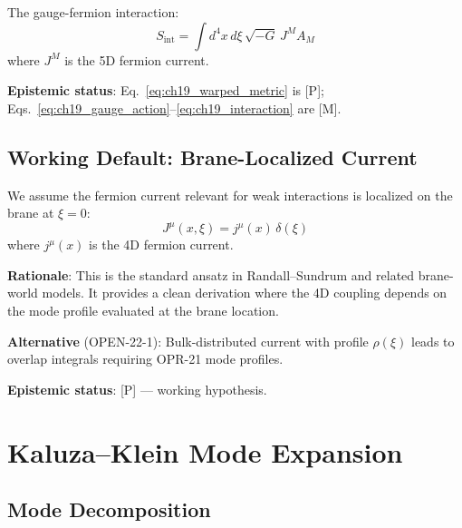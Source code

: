 The gauge-fermion interaction:
\begin{equation}
    S_{\text{int}} = \int d^4x \, d\xi \, \sqrt{-G} \, J^M A_M
    \label{eq:ch19_interaction}
\end{equation}
where $J^M$ is the 5D fermion current.

\textbf{Epistemic status}: Eq.~\eqref{eq:ch19_warped_metric} is [P];
Eqs.~\eqref{eq:ch19_gauge_action}--\eqref{eq:ch19_interaction} are [M].

\subsection{Working Default: Brane-Localized Current}
\label{sec:ch19_brane_current}

\begin{tcolorbox}[colback=yellow!10!white, colframe=yellow!50!black,
    title=\textbf{Working Default (WD-22-1): Brane-Localized Current}]

We assume the fermion current relevant for weak interactions is localized on the
brane at $\xi = 0$:
\begin{equation}
    J^\mu(x,\xi) = j^\mu(x) \, \delta(\xi)
    \label{eq:ch19_brane_current}
\end{equation}
where $j^\mu(x)$ is the 4D fermion current.

\textbf{Rationale}: This is the standard ansatz in Randall--Sundrum and related
brane-world models. It provides a clean derivation where the 4D coupling depends
on the mode profile evaluated at the brane location.

\textbf{Alternative} (OPEN-22-1): Bulk-distributed current with profile $\rho(\xi)$
leads to overlap integrals requiring OPR-21 mode profiles.

\textbf{Epistemic status}: [P] --- working hypothesis.

\end{tcolorbox}


\section{Kaluza--Klein Mode Expansion}
\label{sec:ch19_kk_expansion}

\subsection{Mode Decomposition}

